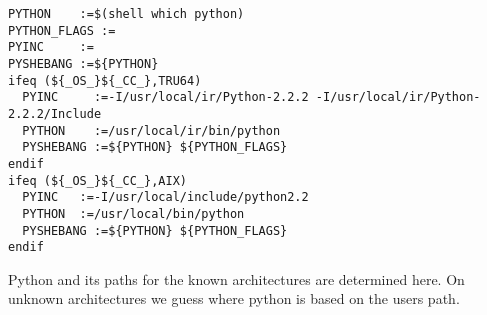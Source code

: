 \documentclass[letterpaper]{article}
\begin{document}
\begin{verbatim}
PYTHON    :=$(shell which python)
PYTHON_FLAGS :=
PYINC     :=
PYSHEBANG :=${PYTHON}
ifeq (${_OS_}${_CC_},TRU64)
  PYINC     :=-I/usr/local/ir/Python-2.2.2 -I/usr/local/ir/Python-2.2.2/Include
  PYTHON    :=/usr/local/ir/bin/python
  PYSHEBANG :=${PYTHON} ${PYTHON_FLAGS}
endif
ifeq (${_OS_}${_CC_},AIX)
  PYINC   :=-I/usr/local/include/python2.2
  PYTHON  :=/usr/local/bin/python
  PYSHEBANG :=${PYTHON} ${PYTHON_FLAGS}
endif
\end{verbatim}
Python and its paths for the known architectures are determined here.  On
unknown architectures we guess where python is based on the users path.
\end{document}
